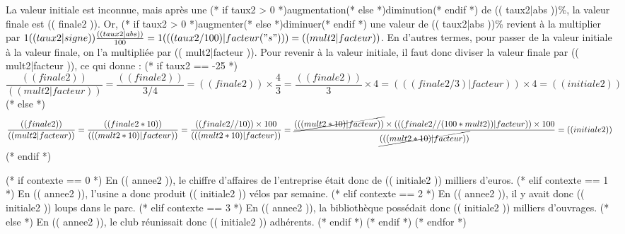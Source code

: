 \begin{enumerate}
\begin{center}
        \end{center}
        La valeur initiale est inconnue, mais après une (* if taux2 > 0 *)augmentation(* else *)diminution(* endif *) de (( taux2|abs ))\%, la valeur finale est (( finale2 )). Or, (* if taux2 > 0 *)augmenter(* else *)diminuer(* endif *) une valeur de (( taux2|abs ))\% revient à la multiplier par $1(( taux2|signe ))\frac{(( taux2|abs ))}{100}=1(( (taux2/100)|facteur("s") ))=(( mult2|facteur ))$. En d'autres termes, pour passer de la valeur initiale à la valeur finale, on l'a multipliée par (( mult2|facteur )). Pour revenir à la valeur initiale, il faut donc diviser la valeur finale par (( mult2|facteur )), ce qui donne :
        (* if taux2 == -25 *)
        \[
        \frac{(( finale2 ))}{(( mult2|facteur ))}
        =\frac{(( finale2 ))}{3/4}
        =(( finale2 ))\times\frac{4}{3}
        =\frac{(( finale2 ))}{3}\times4
        =(( (finale2/3)|facteur ))\times4
        =(( initiale2 ))
        \]
        (* else *)
        \[
        \frac{(( finale2 ))}{(( mult2|facteur ))}
        =\frac{(( finale2 * 10 ))}{(( (mult2*10)|facteur ))}
        =\frac{(( finale2 // 10 )) \times 100}{(( (mult2*10)|facteur ))}
        =\frac{\cancel{(( (mult2 * 10)|facteur ))}\times (( (finale2 // (100 * mult2))|facteur )) \times 100}{\cancel{(( (mult2*10)|facteur ))}}
        =(( initiale2 ))
        \]
        (* endif *)
    
        \begin{center}
        \end{center}
        (* if contexte == 0 *)
          En (( annee2 )), le chiffre d'affaires de l'entreprise était donc de (( initiale2 )) milliers d'euros.
        (* elif contexte == 1 *)
          En (( annee2 )), l'usine a donc produit (( initiale2 )) vélos par semaine.
        (* elif contexte == 2 *)
          En (( annee2 )), il y avait donc (( initiale2 )) loups dans le parc.
        (* elif contexte == 3 *)
          En (( annee2 )), la bibliothèque possédait donc (( initiale2 )) milliers d'ouvrages.
        (* else *)
          En (( annee2 )), le club réunissait donc (( initiale2 )) adhérents.
        (* endif *)
    (* endif *)
  (* endfor *)
\end{enumerate}

